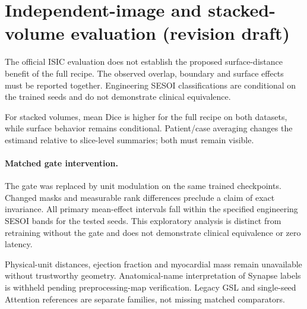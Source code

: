 \section{Independent-image and stacked-volume evaluation (revision draft)}
The official ISIC evaluation does not establish the proposed surface-distance
benefit of the full recipe. The observed overlap, boundary and surface effects
must be reported together. Engineering SESOI classifications are conditional on
the trained seeds and do not demonstrate clinical equivalence.
\begin{table}[ht]
\centering\small

\caption{Registered official-image primary comparison and separate surface
sensitivity. Effects are full recipe minus U-Net. Positive surface differences
favor U-Net. Missing surface units and correction scope are retained in the CSV.}
\end{table}
For stacked volumes, mean Dice is higher for the full recipe on both datasets,
while surface behavior remains conditional. Patient/case averaging changes the
estimand relative to slice-level summaries; both must remain visible.
\begin{table}[ht]
\centering\small

\caption{Exploratory volume family V. ACDC distances use the processed index
grid; Synapse distances use the original H5 index grid. Neither is verified in
millimetres. The source CSV reports complete-unit eligibility and sensitivities.}
\end{table}
\paragraph{Matched gate intervention.}
The gate was replaced by unit modulation on the same trained checkpoints.
Changed masks and measurable rank differences preclude a claim of exact invariance.
All primary mean-effect intervals fall within the specified engineering SESOI
bands for the tested seeds. This exploratory analysis is distinct from retraining
without the gate and does not demonstrate clinical equivalence or zero latency.

Physical-unit distances, ejection fraction and myocardial mass remain unavailable
without trustworthy geometry. Anatomical-name interpretation of Synapse labels
is withheld pending preprocessing-map verification. Legacy GSL and single-seed
Attention references are separate families, not missing matched comparators.
